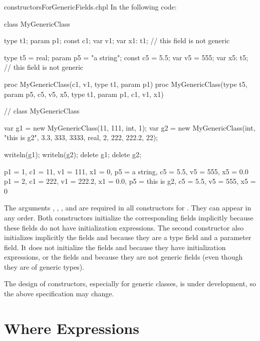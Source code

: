 \begin{chapelexample}{constructorsForGenericFields.chpl}
In the following code:
\begin{chapel}
class MyGenericClass {
  type t1;
  param p1;
  const c1;
  var v1;
  var x1: t1; // this field is not generic

  type t5 = real;
  param p5 = "a string";
  const c5 = 5.5;
  var v5 = 555;
  var x5: t5; // this field is not generic

  proc MyGenericClass(c1, v1, type t1, param p1) { }
  proc MyGenericClass(type t5, param p5, c5, v5, x5,
                     type t1, param p1, c1, v1, x1) { }
}  // class MyGenericClass

var g1 = new MyGenericClass(11, 111, int, 1);
var g2 = new MyGenericClass(int, "this is g2", 3.3, 333, 3333,
                            real, 2, 222, 222.2, 22);
\end{chapel}
\begin{chapelpost}
writeln(g1);
writeln(g2);
delete g1;
delete g2;
\end{chapelpost}
\begin{chapeloutput}
{p1 = 1, c1 = 11, v1 = 111, x1 = 0, p5 = a string, c5 = 5.5, v5 = 555, x5 = 0.0}
{p1 = 2, c1 = 222, v1 = 222.2, x1 = 0.0, p5 = this is g2, c5 = 5.5, v5 = 555, x5 = 0}
\end{chapeloutput}
The arguments , , , and  are
required in all constructors for . They can appear
in any order. Both  constructors initialize the
corresponding fields implicitly because these fields do not have initialization
expressions. The second constructor also initializes implicitly
the fields  and  because they are a type field
and a parameter field. It does not initialize the fields 
and  because they have initialization expressions, or
the fields  and  because they are not generic fields
(even though they are of generic types).
\end{chapelexample}

\begin{openissue}
The design of constructors, especially for generic classes, is
under development, so the above specification may change.
\end{openissue}

\section{Where Expressions}
\label{Where_Expressions}

